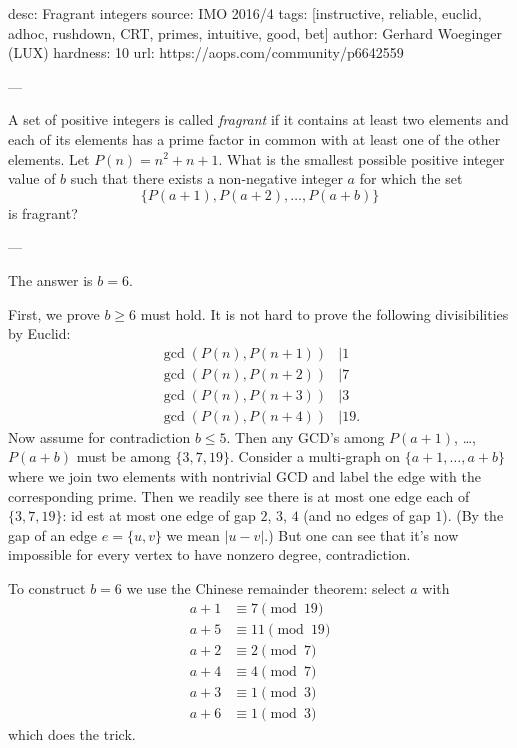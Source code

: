 desc:  Fragrant integers
source:  IMO 2016/4
tags:  [instructive, reliable, euclid, adhoc, rushdown, CRT, primes, intuitive, good, bet]
author: Gerhard Woeginger (LUX)
hardness: 10
url: https://aops.com/community/p6642559

---

A set of positive integers is called \emph{fragrant}
if it contains at least two elements and each of its elements
has a prime factor in common with at least one of the other elements.
Let $P(n)=n^2+n+1$.
What is the smallest possible positive integer value of $b$ such that
there exists a non-negative integer $a$ for which the set
\[ \{P(a+1),P(a+2),\dots,P(a+b)\} \]
is fragrant?

---

The answer is $b = 6$.

First, we prove $b \ge 6$ must hold.
It is not hard to prove the following divisibilities by Euclid:
\begin{align*}
 \gcd(P(n), P(n+1)) &\mid 1 \\
 \gcd(P(n), P(n+2)) &\mid 7 \\
 \gcd(P(n), P(n+3)) &\mid 3 \\
 \gcd(P(n), P(n+4)) &\mid 19.
\end{align*}
Now assume for contradiction $b \le 5$.
Then any GCD's among $P(a+1)$, \dots, $P(a+b)$ must be among $\{3, 7, 19\}$.
Consider a multi-graph on $\{a+1, \dots, a+b\}$ where we join two elements with nontrivial GCD
and label the edge with the corresponding prime.
Then we readily see there is at most one edge each of $\{3, 7, 19\}$:
id est at most one edge of gap $2$, $3$, $4$ (and no edges of gap $1$).
(By the gap of an edge $e = \{u,v\}$ we mean $|u - v|$.)
But one can see that it's now impossible for every vertex to have nonzero degree, contradiction.

To construct $b = 6$ we use the Chinese remainder theorem: select $a$ with
\begin{align*}
 a+1 & \equiv 7 \pmod{19} \\
 a+5 & \equiv 11 \pmod{19} \\
 a+2 & \equiv 2 \pmod{7} \\
 a+4 & \equiv 4 \pmod{7} \\
 a+3 & \equiv 1 \pmod{3} \\
 a+6 & \equiv 1 \pmod{3}
\end{align*}
which does the trick.

